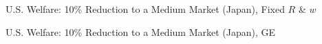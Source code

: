 \documentclass[9pt,pdftex,aspectratio=1610]{beamer}
\theoremstyle{definition}
\begin{document}
\begin{frame}[t]{U.S. Welfare: 10\% Reduction to a Medium Market (Japan), {\color{red} Fixed $R$ \& $w$} }
\vspace{-.5cm}
\begin{figure}[!t]
\end{figure}
\end{frame}

\begin{frame}[t]{U.S. Welfare: 10\% Reduction to a Medium Market (Japan), {\color{red} GE} }
\vspace{-.5cm}
\begin{figure}[!t]
\end{figure}
\end{frame}
\end{document}
